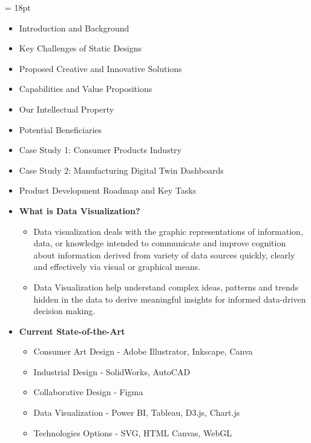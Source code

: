 \documentclass{ammTalk}
\begin{document}
\maketitle
\clearpage
\pagestyle{slideDesign}
\confidential{}
\baselineskip = 18pt
\begin{itemize}[before=\LARGE\normalfont]
 \item Introduction and Background
 \item Key Challenges of Static Designs
 \item Proposed Creative and Innovative Solutions %
 \item Capabilities and Value Propositions
 \item Our Intellectual Property
 \item Potential Beneficiaries %
 \item Case Study 1: Consumer Products Industry
 \item Case Study 2: Manufacturing Digital Twin Dashboards
 \item Product Development Roadmap and Key Tasks %
\end{itemize}

\begin{itemize}[itemsep=6mm]\LARGE
\item \textbf{What is Data Visualization?}
\begin{itemize}\Large
\item Data visualization deals with the graphic representations of information, data, or knowledge intended to communicate and improve cognition about information derived from variety of data sources quickly, clearly and effectively via visual or graphical means.
\item Data Visualization help understand complex ideas, patterns and trends hidden in the data to derive meaningful insights for informed data-driven decision making.
\end{itemize}
\item \textbf{Current State-of-the-Art}
\begin{itemize}\Large
\item Consumer Art Design - Adobe Illustrator, Inkscape, Canva
\item Industrial Design - SolidWorks, AutoCAD
\item Collaborative Design - Figma
\item Data Visualization - Power BI, Tableau, D3.js, Chart.js
\item Technologies Options - SVG, HTML Canvas, WebGL
\end{itemize}
\end{itemize}
\end{document}
